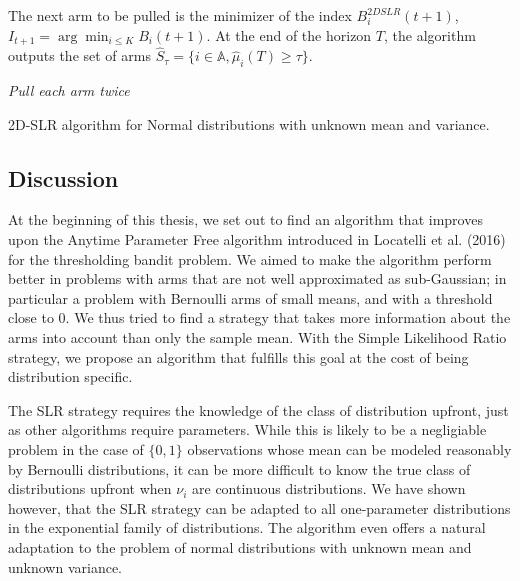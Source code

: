 \documentclass[11pt,]{article}
\begin{document}
The next arm to be pulled is the minimizer of the index
\(B_i^{2DSLR}(t+1)\), \(I_{t+1} = \arg \min_{i \leq K} B_i(t+1)\). At
the end of the horizon \(T\), the algorithm outputs the set of arms
\(\hat{S}_\tau = \{i \in \mathbb{A}, \hat{\mu}_i(T) \geq \tau\}\).

\IncMargin{1em}

\begin{algorithm}
\BlankLine
\emph{Pull each arm twice}\;
\caption{2D-SLR algorithm for Normal distributions with unknown mean and variance.}\label{algo_slr_2d}
\end{algorithm}

\DecMargin{1em}

\subsection{Discussion}\label{discussion-1}

At the beginning of this thesis, we set out to find an algorithm that
improves upon the Anytime Parameter Free algorithm introduced in
Locatelli et al. (2016) for the thresholding bandit problem. We aimed to
make the algorithm perform better in problems with arms that are not
well approximated as sub-Gaussian; in particular a problem with
Bernoulli arms of small means, and with a threshold close to 0. We thus
tried to find a strategy that takes more information about the arms into
account than only the sample mean. With the Simple Likelihood Ratio
strategy, we propose an algorithm that fulfills this goal at the cost of
being distribution specific.

The SLR strategy requires the knowledge of the class of distribution
upfront, just as other algorithms require parameters. While this is
likely to be a negligiable problem in the case of \(\{0,1\}\)
observations whose mean can be modeled reasonably by Bernoulli
distributions, it can be more difficult to know the true class of
distributions upfront when \(\nu_i\) are continuous distributions. We
have shown however, that the SLR strategy can be adapted to all
one-parameter distributions in the exponential family of distributions.
The algorithm even offers a natural adaptation to the problem of normal
distributions with unknown mean and unknown variance.
\end{document}
